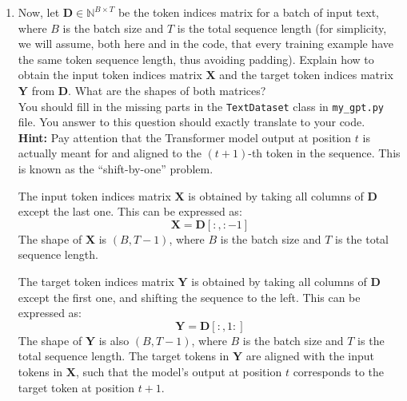 \begin{enumerate}
\begin{enumerate}
\begin{answerbox}[1.5in]
    \end{answerbox}

    \item Now, let $\mathbf{D} \in \mathbb{N}^{B \times T}$ be the token indices matrix for a batch of input text, where $B$ is the batch size and $T$ is the total sequence length (for simplicity, we will assume, both here and in the code, that every training example have the same token sequence length, thus avoiding padding). Explain how to obtain the input token indices matrix $\mathbf{X}$ and the target token indices matrix $\mathbf{Y}$ from $\mathbf{D}$. What are the shapes of both matrices? \\
    You should fill in the missing parts in the \texttt{TextDataset} class in \texttt{my\_gpt.py} file. You answer to this question should exactly translate to your code.\\
    \textbf{Hint:} Pay attention that the Transformer model output at position $t$ is actually meant for and aligned to the $(t+1)$-th token in the sequence. This is known as the ``shift-by-one'' problem.
    
    \begin{answerbox}[2.5in]
    The input token indices matrix $\mathbf{X}$ is obtained by taking all columns of $\mathbf{D}$ except the last one. This can be expressed as:
    \[
    \mathbf{X} = \mathbf{D}[:, :-1]
    \]
    The shape of $\mathbf{X}$ is $(B, T-1)$, where $B$ is the batch size and $T$ is the total sequence length.

    The target token indices matrix $\mathbf{Y}$ is obtained by taking all columns of $\mathbf{D}$ except the first one, and shifting the sequence to the left. This can be expressed as:
    \[
    \mathbf{Y} = \mathbf{D}[:, 1:]
    \]
    The shape of $\mathbf{Y}$ is also $(B, T-1)$, where $B$ is the batch size and $T$ is the total sequence length. The target tokens in $\mathbf{Y}$ are aligned with the input tokens in $\mathbf{X}$, such that the model's output at position $t$ corresponds to the target token at position $t+1$.

    \end{answerbox}
    
\end{enumerate}


\end{enumerate}
